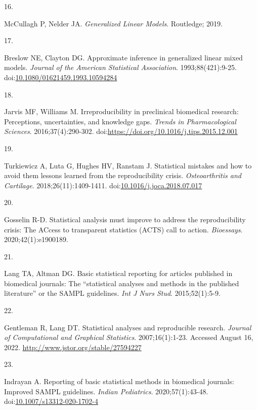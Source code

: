\documentclass[
]{article}
\newlength{\cslhangindent}
\newlength{\csllabelwidth}
\newlength{\cslentryspacingunit} %
\newenvironment{CSLReferences}[2] %
 {%
  \setlength{\parindent}{0pt}
  \ifodd #1
  \let\oldpar\par
  \def\par{\hangindent=\cslhangindent\oldpar}
  \fi
  \setlength{\parskip}{#2\cslentryspacingunit}
 }%
 {}
\newcommand{\CSLLeftMargin}[1]{\parbox[t]{\csllabelwidth}{#1}}
\newcommand{\CSLRightInline}[1]{\parbox[t]{\linewidth - \csllabelwidth}{#1}\break}
\begin{document}
\begin{CSLReferences}{0}{0}
\leavevmode{}%
\CSLLeftMargin{16. }%
\CSLRightInline{McCullagh P, Nelder JA. \emph{Generalized Linear
Models}. Routledge; 2019.}

\leavevmode{}%
\CSLLeftMargin{17. }%
\CSLRightInline{Breslow NE, Clayton DG. Approximate inference in
generalized linear mixed models. \emph{Journal of the American
Statistical Association}. 1993;88(421):9-25.
doi:\href{https://doi.org/10.1080/01621459.1993.10594284}{10.1080/01621459.1993.10594284}}

\leavevmode{}%
\CSLLeftMargin{18. }%
\CSLRightInline{Jarvis MF, Williams M. Irreproducibility in preclinical
biomedical research: Perceptions, uncertainties, and knowledge gaps.
\emph{Trends in Pharmacological Sciences}. 2016;37(4):290-302.
doi:\url{https://doi.org/10.1016/j.tips.2015.12.001}}

\leavevmode{}%
\CSLLeftMargin{19. }%
\CSLRightInline{Turkiewicz A, Luta G, Hughes HV, Ranstam J. Statistical
mistakes and how to avoid them {\textendash} lessons learned from the
reproducibility crisis. \emph{Osteoarthritis and Cartilage}.
2018;26(11):1409-1411.
doi:\href{https://doi.org/10.1016/j.joca.2018.07.017}{10.1016/j.joca.2018.07.017}}

\leavevmode{}%
\CSLLeftMargin{20. }%
\CSLRightInline{Gosselin R-D. Statistical analysis must improve to
address the reproducibility crisis: The {ACcess} to transparent
statistics ({ACTS}) call to action. \emph{Bioessays}.
2020;42(1):e1900189.}

\leavevmode{}%
\CSLLeftMargin{21. }%
\CSLRightInline{Lang TA, Altman DG. Basic statistical reporting for
articles published in biomedical journals: The {``statistical analyses
and methods in the published literature''} or the {SAMPL} guidelines.
\emph{Int J Nurs Stud}. 2015;52(1):5-9.}

\leavevmode{}%
\CSLLeftMargin{22. }%
\CSLRightInline{Gentleman R, Lang DT. Statistical analyses and
reproducible research. \emph{Journal of Computational and Graphical
Statistics}. 2007;16(1):1-23. Accessed August 16, 2022.
\url{http://www.jstor.org/stable/27594227}}

\leavevmode{}%
\CSLLeftMargin{23. }%
\CSLRightInline{Indrayan A. Reporting of basic statistical methods in
biomedical journals: Improved {SAMPL} guidelines. \emph{Indian
Pediatrics}. 2020;57(1):43-48.
doi:\href{https://doi.org/10.1007/s13312-020-1702-4}{10.1007/s13312-020-1702-4}}

\end{CSLReferences}
\end{document}
